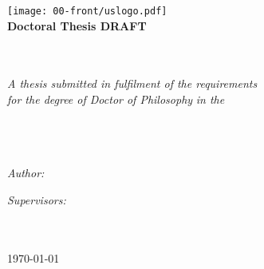 \pagestyle{empty}
	\begin{center}

		\texttt{[image: 00-front/uslogo.pdf]}\\[1cm]%
		\textbf{\Large Doctoral Thesis DRAFT}

		\Huge \textbf{\myTitle}\\[0.5cm] %
        \large \textbf{\mySubtitle}\\[2cm]
		\large \textit{A thesis submitted in fulfilment of the requirements\\ for the degree of Doctor of Philosophy} %
		\textit{in the}\\[1.5cm]
		\myDepartment\\ \myFaculty\\ \myUni\\[1cm]
	
		\begin{minipage}{.45\linewidth}
			\begin{flushleft} %
			\emph{Author:}\\
			{\myName}
			\newline
			\newline
			\end{flushleft}
		\end{minipage}
		\hfill
		\begin{minipage}{.45\linewidth}
			\begin{flushright} %
			\emph{Supervisors:} \\
			\myFirstSupervisor \\%
			\mySecondSupervisor \\%
			\myThirdSupervisor %
			\end{flushright}
		\end{minipage}

		\vfill
		\large \today
		 
	\end{center}
